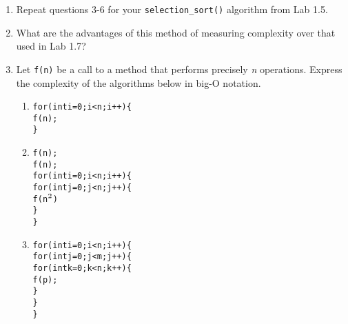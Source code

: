 \documentclass[11pt,a4paper]{report}
\begin{document}
\begin{enumerate}
    \item Repeat questions 3-6 for your \texttt{selection\_sort()} algorithm from Lab 1.5.

    \item What are the advantages of this method of measuring complexity over that used in Lab 1.7?

    \item Let \texttt{f(n)} be a call to a method that performs precisely \textit{n} operations. Express the complexity of the algorithms below in big-O notation.
    \begin{enumerate}
        \item
\begin{alltt}
for(int i = 0; i < n; i++)\{
    f(n);
\}
\end{alltt}

        \vskip20pt
        \item 

\begin{alltt}
f(n);
f(n);
for(int i = 0; i < n; i++)\{
    for(int j = 0; j < n; j++)\{
        f(n\(\sp{2}\))
    \}
\}
\end{alltt}

    \vskip20pt
    \newpage
    \item

\begin{alltt}
for(int i = 0; i < n; i++)\{
    for(int j = 0; j < m; j++)\{
        for(int k = 0; k < n; k++)\{
            f(p);
        \}
    \}
\}
\end{alltt}

    \end{enumerate}
\end{enumerate}
\end{document}
